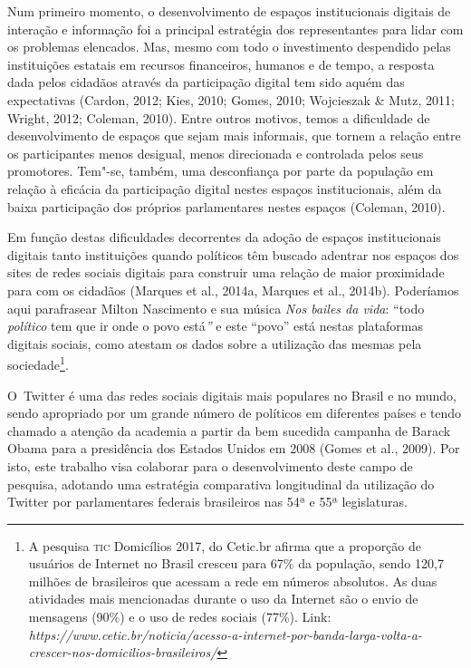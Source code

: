 Num primeiro momento, o desenvolvimento de espaços institucionais
digitais de interação e informação foi a principal estratégia dos
representantes para lidar com os problemas elencados. Mas, mesmo com
todo o investimento despendido pelas instituições estatais em recursos
financeiros, humanos e de tempo, a resposta dada pelos cidadãos através
da participação digital tem sido aquém das expectativas (Cardon, 2012;
Kies, 2010; Gomes, 2010; Wojcieszak \& Mutz, 2011; Wright, 2012;
Coleman, 2010). Entre outros motivos, temos a dificuldade de
desenvolvimento de espaços que sejam mais informais, que tornem a
relação entre os participantes menos desigual, menos direcionada e
controlada pelos seus promotores. Tem"-se, também, uma desconfiança por
parte da população em relação à eficácia da participação digital nestes
espaços institucionais, além da baixa participação dos próprios
parlamentares nestes espaços (Coleman, 2010).

Em função destas dificuldades decorrentes da adoção de espaços
institucionais digitais tanto instituições quando políticos têm buscado
adentrar nos espaços dos sites de redes sociais digitais para construir
uma relação de maior proximidade para com os cidadãos (Marques et al.,
2014a, Marques et al., 2014b). Poderíamos aqui parafrasear Milton
Nascimento e sua música \emph{Nos bailes da vida}: ``todo
\emph{político} tem que ir onde o povo está\emph{''} e este ``povo''
está nestas plataformas digitais sociais, como atestam os dados sobre a
utilização das mesmas pela sociedade\footnote{A pesquisa \textsc{tic} Domicílios
  2017, do Cetic.br afirma que a proporção de usuários de Internet no
  Brasil cresceu para 67\% da população, sendo 120,7 milhões de
  brasileiros que acessam a rede em números absolutos. As duas
  atividades mais mencionadas durante o uso da Internet são o envio de
  mensagens (90\%) e o uso de redes sociais (77\%). Link:
  \emph{https://www.cetic.br/noticia/acesso-a-internet-por-banda-larga-volta-a-crescer-nos-domicilios-brasileiros/}}.

O~Twitter é uma das redes sociais digitais mais populares no Brasil e no
mundo, sendo apropriado por um grande número de políticos em diferentes
países e tendo chamado a atenção da academia a partir da bem sucedida
campanha de Barack Obama para a presidência dos Estados Unidos em 2008
(Gomes et al., 2009). Por isto, este trabalho visa colaborar para o
desenvolvimento deste campo de pesquisa, adotando uma estratégia
comparativa longitudinal da utilização do Twitter por parlamentares
federais brasileiros nas 54ª e 55ª legislaturas.

